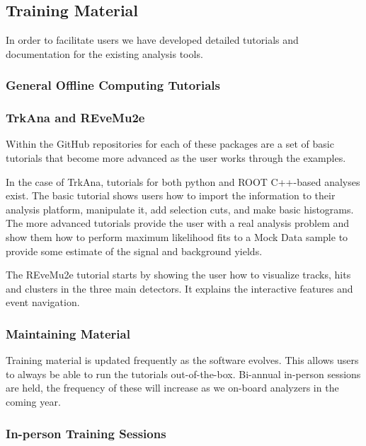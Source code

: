 \subsection{Training Material}

In order to facilitate users we have developed detailed tutorials and documentation for the existing analysis tools.

\subsubsection{General Offline Computing Tutorials}

\subsubsection{TrkAna and REveMu2e}

Within the GitHub repositories for each of these packages are a set of basic tutorials that become more advanced as the user works through the examples.

In the case of TrkAna, tutorials for both python and ROOT C++-based analyses exist. The basic tutorial shows users how to import the information to their analysis platform, manipulate it, add selection cuts, and make basic histograms. The more advanced tutorials provide the user with a real analysis problem and show them how to perform maximum likelihood fits to a Mock Data sample to provide some estimate of the signal and background yields.

The REveMu2e tutorial starts by showing the user how to visualize tracks, hits and clusters in the three main detectors. It explains the interactive features and event navigation.

\subsubsection{Maintaining Material}
Training material is updated frequently as the software evolves. This allows users to always be able to run the tutorials out-of-the-box. Bi-annual in-person sessions are held, the frequency of these will increase as we on-board analyzers in the coming year.

\subsubsection{In-person Training Sessions}